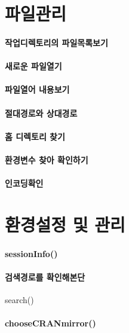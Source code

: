 \section{파일관리}
 
\paragraph{작업디렉토리의 파일목록보기 } 
\paragraph{새로운 파일열기}
\paragraph{파일열어 내용보기}
\paragraph{절대경로와 상대경로}
\paragraph{홈 디렉토리 찾기}
\paragraph{환경변수 찾아 확인하기}
\paragraph{인코딩확인}
\paragraph{}
\paragraph{}

\section{환경설정 및 관리}

\paragraph{sessionInfo()}
\paragraph{검색경로를 확인해본단} search()
\paragraph{chooseCRANmirror()}
